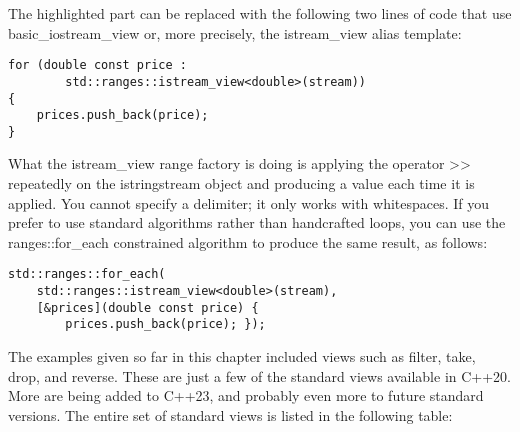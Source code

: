 The highlighted part can be replaced with the following two lines of code that use basic\_iostream\_view or, more precisely, the istream\_view alias template:

\begin{lstlisting}[style=styleCXX]
for (double const price :
		std::ranges::istream_view<double>(stream))
{
	prices.push_back(price);
}
\end{lstlisting}

What the istream\_view range factory is doing is applying the operator >{}> repeatedly on the istringstream object and producing a value each time it is applied. You cannot specify a delimiter; it only works with whitespaces. If you prefer to use standard algorithms rather than handcrafted loops, you can use the ranges::for\_each constrained algorithm to produce the same result, as follows:

\begin{lstlisting}[style=styleCXX]
std::ranges::for_each(
	std::ranges::istream_view<double>(stream),
	[&prices](double const price) {
		prices.push_back(price); });
\end{lstlisting}

The examples given so far in this chapter included views such as filter, take, drop, and reverse. These are just a few of the standard views available in C++20. More are being added to C++23, and probably even more to future standard versions. The entire set of standard views is listed in the following table:

